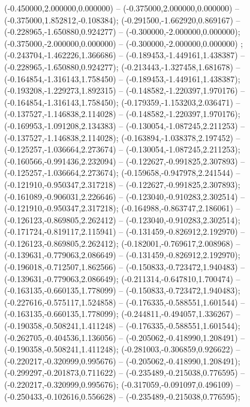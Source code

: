  (-0.450000,2.000000,0.000000) -- (-0.375000,2.000000,0.000000) -- (-0.375000,1.852812,-0.108384);
 (-0.291500,-1.662920,0.869167) -- (-0.228965,-1.650880,0.924277) -- (-0.300000,-2.000000,0.000000);
 (-0.375000,-2.000000,0.000000) -- (-0.300000,-2.000000,0.000000) ;
 (-0.243704,-1.462226,1.366686) -- (-0.189453,-1.449161,1.438387) -- (-0.228965,-1.650880,0.924277);
 (-0.213443,-1.327458,1.681678) -- (-0.164854,-1.316143,1.758450) -- (-0.189453,-1.449161,1.438387);
 (-0.193208,-1.229273,1.892315) -- (-0.148582,-1.220397,1.970176) -- (-0.164854,-1.316143,1.758450);
 (-0.179359,-1.153203,2.036471) -- (-0.137527,-1.146838,2.114028) -- (-0.148582,-1.220397,1.970176);
 (-0.169953,-1.091208,2.134383) -- (-0.130054,-1.087245,2.211253) -- (-0.137527,-1.146838,2.114028);
 (-0.163894,-1.038378,2.197452) -- (-0.125257,-1.036664,2.273674) -- (-0.130054,-1.087245,2.211253);
 (-0.160566,-0.991436,2.232094) -- (-0.122627,-0.991825,2.307893) -- (-0.125257,-1.036664,2.273674);
 (-0.159658,-0.947978,2.241544) -- (-0.121910,-0.950347,2.317218) -- (-0.122627,-0.991825,2.307893);
 (-0.161089,-0.906031,2.226646) -- (-0.123040,-0.910283,2.302514) -- (-0.121910,-0.950347,2.317218);
 (-0.164988,-0.863747,2.186061) -- (-0.126123,-0.869805,2.262412) -- (-0.123040,-0.910283,2.302514);
 (-0.171724,-0.819117,2.115941) -- (-0.131459,-0.826912,2.192970) -- (-0.126123,-0.869805,2.262412);
 (-0.182001,-0.769617,2.008968) -- (-0.139631,-0.779063,2.086649) -- (-0.131459,-0.826912,2.192970);
 (-0.196018,-0.712507,1.862566) -- (-0.150833,-0.723472,1.940483) -- (-0.139631,-0.779063,2.086649);
 (-0.211314,-0.647810,1.700474) -- (-0.163135,-0.660135,1.778099) -- (-0.150833,-0.723472,1.940483);
 (-0.227616,-0.575117,1.524858) -- (-0.176335,-0.588551,1.601544) -- (-0.163135,-0.660135,1.778099);
 (-0.244811,-0.494057,1.336267) -- (-0.190358,-0.508241,1.411248) -- (-0.176335,-0.588551,1.601544);
 (-0.262705,-0.404536,1.136056) -- (-0.205062,-0.418990,1.208491) -- (-0.190358,-0.508241,1.411248);
 (-0.281003,-0.306859,0.926622) -- (-0.220217,-0.320999,0.995676) -- (-0.205062,-0.418990,1.208491);
 (-0.299297,-0.201873,0.711622) -- (-0.235489,-0.215038,0.776595) -- (-0.220217,-0.320999,0.995676);
 (-0.317059,-0.091097,0.496109) -- (-0.250433,-0.102616,0.556628) -- (-0.235489,-0.215038,0.776595);
